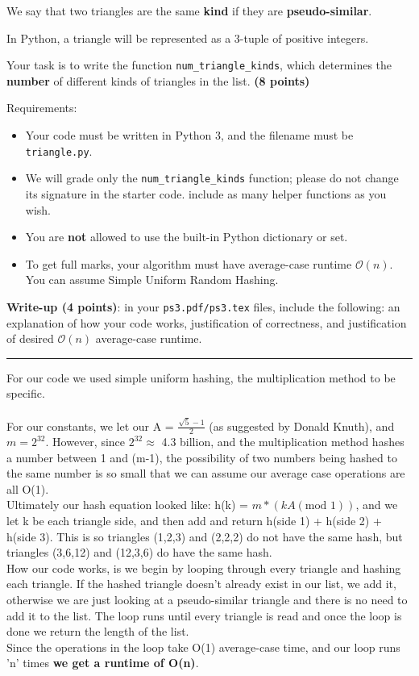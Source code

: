 \documentclass{assignment-263}
\begin{document}
\begin{enumerate}
  We say that two triangles are the same {\bf kind} if they are
  \textbf{pseudo-similar}.

  In Python, a triangle will be represented as a 3-tuple of positive
  integers.

  Your task is to write the function \verb|num_triangle_kinds|, which
  determines the \textbf{number} of different kinds of triangles in
  the list. \textbf{(8 points)}


Requirements:
\begin{itemize}
\item Your code must be written in Python 3, and the filename must be \verb|triangle.py|.
\item We will grade only the \verb|num_triangle_kinds| function; please do not change its signature in the starter code. include as many helper functions as you wish.
   \item You are {\bf not} allowed to use the built-in Python
			dictionary or set.
			\item To get full marks, your algorithm must have average-case runtime
				$\mathcal{O}(n)$. You can assume Simple Uniform Random Hashing.
   \end{itemize}

\textbf{Write-up (4 points)}: in your \verb|ps3.pdf/ps3.tex| files, include the following: an explanation of how your code works, justification of correctness, and
 justification of desired $\mathcal{O}(n)$ average-case runtime.
  \newline \hrule \vskip10pt
  
  For our code we used simple uniform hashing, the multiplication method to be specific. \\\\
  For our constants, we let our A = $\frac{\sqrt{5}-1}{2}$ (as suggested by Donald Knuth), and $m=2^{32}$. However, since $2^{32} \approx$ 4.3 billion, and the multiplication method hashes a number between 1 and (m-1), the possibility of two numbers being hashed to the same number is so small that we can assume our average case operations are all O(1). \\
  
  Ultimately our hash equation looked like: \indent h(k) = $m*(kA(\text{mod }1))$, and we let k be  each triangle side, and then add and return h(side 1) + h(side 2) + h(side 3). This is so triangles (1,2,3) and (2,2,2) do not have the same hash, but triangles (3,6,12) and (12,3,6) do have the same hash. \\
  
  How our code works, is we begin by looping through every triangle and hashing each triangle. If the hashed triangle doesn't already exist in our list,  we add it, otherwise we are just looking at a pseudo-similar triangle and there is no need to add it to the list. The loop runs until every triangle is read and once the loop is done we return the length of the list.\\
  
  Since the operations in the loop take O(1) average-case time, and our loop runs 'n' times \textbf{we get a runtime of O(n)}.

 \end{enumerate}
\end{document}
